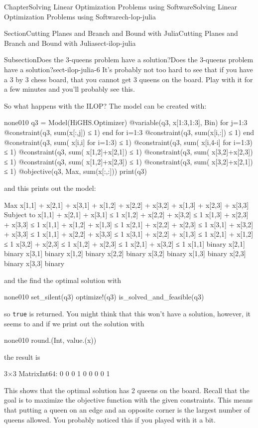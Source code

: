 \documentclass[oneside,10pt,]{book}
\newcommand{\mono}[1]{\texttt{#1}}
\numberwithin{equation}{section}
\begin{document}
\begin{chapterptx}{Chapter}{Solving Linear Optimization Problems using Software}{}{Solving Linear Optimization Problems using Software}{}{}{ch-lop-julia}
\begin{sectionptx}{Section}{Cutting Planes and Branch and Bound with Julia}{}{Cutting Planes and Branch and Bound with Julia}{}{}{sect-ilop-julia}
\begin{subsectionptx}{Subsection}{Does the 3-queens problem have a solution?}{}{Does the 3-queens problem have a solution?}{}{}{sect-ilop-julia-6}
It's probably not too hard to see that if you have a 3 by 3 chess board, that you cannot get 3 queens on the board. Play with it for a few minutes and you'll probably see this.%
\par
So what happens with the ILOP?  The model can be created with:%
\begin{program}{none}{0}{1}{0}
q3 = Model(HiGHS.Optimizer)
@variable(q3, x[1:3,1:3], Bin)
for j=1:3
  @constraint(q3, sum(x[:,j]) ≤  1)
end
for i=1:3
  @constraint(q3, sum(x[i,:]) ≤ 1)
end
@constraint(q3, sum( x[i,i] for i=1:3) ≤  1)
@constraint(q3, sum( x[i,4-i] for i=1:3) ≤  1)
@constraint(q3, sum( x[1,2]+x[2,1]) ≤ 1)
@constraint(q3, sum( x[3,2]+x[2,3]) ≤ 1)
@constraint(q3, sum( x[1,2]+x[2,3]) ≤ 1)
@constraint(q3, sum( x[3,2]+x[2,1]) ≤ 1)
@objective(q3, Max, sum(x[:,:]))
print(q3)
\end{program}
and this prints out the model:%
\par
%
\begin{codedisplay}
Max x[1,1] + x[2,1] + x[3,1] + x[1,2] + x[2,2] + x[3,2] + x[1,3] + x[2,3] + x[3,3]
Subject to
 x[1,1] + x[2,1] + x[3,1] ≤ 1
 x[1,2] + x[2,2] + x[3,2] ≤ 1
 x[1,3] + x[2,3] + x[3,3] ≤ 1
 x[1,1] + x[1,2] + x[1,3] ≤ 1
 x[2,1] + x[2,2] + x[2,3] ≤ 1
 x[3,1] + x[3,2] + x[3,3] ≤ 1
 x[1,1] + x[2,2] + x[3,3] ≤ 1
 x[3,1] + x[2,2] + x[1,3] ≤ 1
 x[2,1] + x[1,2] ≤ 1
 x[3,2] + x[2,3] ≤ 1
 x[1,2] + x[2,3] ≤ 1
 x[2,1] + x[3,2] ≤ 1
 x[1,1] binary
 x[2,1] binary
 x[3,1] binary
 x[1,2] binary
 x[2,2] binary
 x[3,2] binary
 x[1,3] binary
 x[2,3] binary
 x[3,3] binary
\end{codedisplay}
%
\par
and the find the optimal solution with%
\begin{program}{none}{0}{1}{0}
set_silent(q3)
optimize!(q3)
is_solved_and_feasible(q3)
\end{program}
so \mono{true} is returned.  You might think that this won't have a solution, however, it seems to and if we print out the solution with%
\begin{program}{none}{0}{1}{0}
round.(Int, value.(x))
\end{program}
the result is%
\par
%
\begin{codedisplay}
3×3 Matrix{Int64}:
 0  0  0
 1  0  0
 0  0  1
\end{codedisplay}
%
\par
This shows that the optimal solution has 2 queens on the board.  Recall that the goal is to maximize the objective function with the given constraints.  This means that putting a queen on an edge and an opposite corner is the largest number of queens allowed.  You probably noticed this if you played with it a bit.%
\end{subsectionptx}
\end{sectionptx}
\end{chapterptx}
\end{document}
